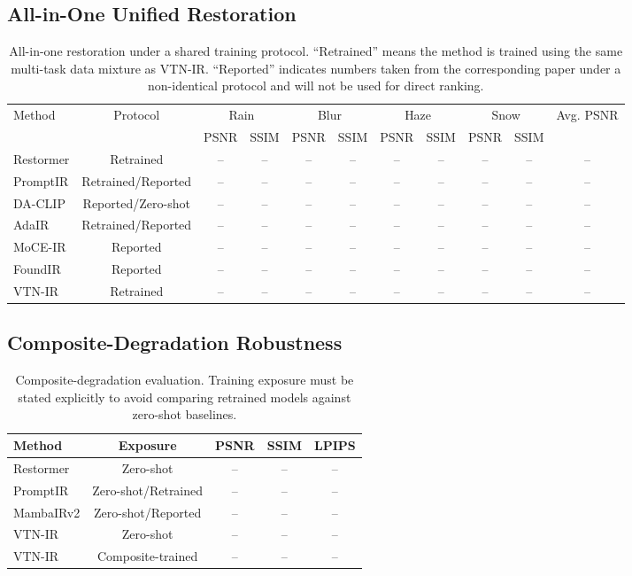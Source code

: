 \documentclass[10pt,twocolumn]{article}
\newcommand{\ours}{VTN-IR}
\begin{document}
\subsection{All-in-One Unified Restoration}
\begin{table}[t]
\centering
\caption{All-in-one restoration under a shared training protocol. ``Retrained'' means the method is trained using the same multi-task data mixture as \ours. ``Reported'' indicates numbers taken from the corresponding paper under a non-identical protocol and will not be used for direct ranking.}
\label{tab:all_in_one}
\small
\begin{tabular}{lcccccccccc}
\toprule
\multirow{2}{*}{Method} & \multirow{2}{*}{Protocol} & \multicolumn{2}{c}{Rain} & \multicolumn{2}{c}{Blur} & \multicolumn{2}{c}{Haze} & \multicolumn{2}{c}{Snow} & Avg. PSNR \\
 & & PSNR & SSIM & PSNR & SSIM & PSNR & SSIM & PSNR & SSIM & \\
\midrule
Restormer & Retrained & -- & -- & -- & -- & -- & -- & -- & -- & -- \\
PromptIR & Retrained/Reported & -- & -- & -- & -- & -- & -- & -- & -- & -- \\
DA-CLIP & Reported/Zero-shot & -- & -- & -- & -- & -- & -- & -- & -- & -- \\
AdaIR & Retrained/Reported & -- & -- & -- & -- & -- & -- & -- & -- & -- \\
MoCE-IR & Reported & -- & -- & -- & -- & -- & -- & -- & -- & -- \\
FoundIR & Reported & -- & -- & -- & -- & -- & -- & -- & -- & -- \\
\ours & Retrained & -- & -- & -- & -- & -- & -- & -- & -- & -- \\
\bottomrule
\end{tabular}
\end{table}

\subsection{Composite-Degradation Robustness}
\begin{table}[t]
\centering
\caption{Composite-degradation evaluation. Training exposure must be stated explicitly to avoid comparing retrained models against zero-shot baselines.}
\label{tab:composite}
\small
\begin{tabular}{lcccc}
\toprule
Method & Exposure & PSNR & SSIM & LPIPS \\
\midrule
Restormer & Zero-shot & -- & -- & -- \\
PromptIR & Zero-shot/Retrained & -- & -- & -- \\
MambaIRv2 & Zero-shot/Reported & -- & -- & -- \\
\ours & Zero-shot & -- & -- & -- \\
\ours & Composite-trained & -- & -- & -- \\
\bottomrule
\end{tabular}
\end{table}
\end{document}
